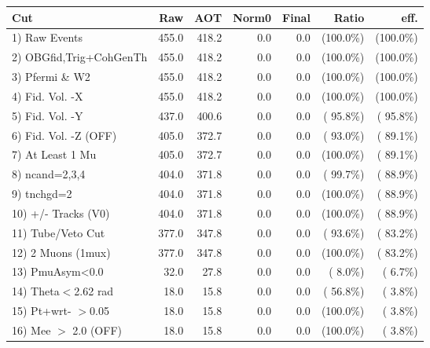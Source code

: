  \begin{table}[h!]\centering
 \begin{tabular}{||l||r|r|r|r|r|r||}
 \hline
 \hline
 Cut & Raw & AOT & Norm0 & Final & Ratio & eff.       \\
 \hline
  1) Raw Events           &        455.0 &        418.2 &          0.0 &          0.0 & (100.0\%) & (100.0\%) \\
  2) OBGfid,Trig+CohGenTh &        455.0 &        418.2 &          0.0 &          0.0 & (100.0\%) & (100.0\%) \\
  3) Pfermi \& W2         &        455.0 &        418.2 &          0.0 &          0.0 & (100.0\%) & (100.0\%) \\
  4) Fid. Vol. -X         &        455.0 &        418.2 &          0.0 &          0.0 & (100.0\%) & (100.0\%) \\
  5) Fid. Vol. -Y         &        437.0 &        400.6 &          0.0 &          0.0 & ( 95.8\%) & ( 95.8\%) \\
  6) Fid. Vol. -Z (OFF)   &        405.0 &        372.7 &          0.0 &          0.0 & ( 93.0\%) & ( 89.1\%) \\
  7) At Least 1 Mu        &        405.0 &        372.7 &          0.0 &          0.0 & (100.0\%) & ( 89.1\%) \\
  8) ncand=2,3,4          &        404.0 &        371.8 &          0.0 &          0.0 & ( 99.7\%) & ( 88.9\%) \\
  9) tnchgd=2             &        404.0 &        371.8 &          0.0 &          0.0 & (100.0\%) & ( 88.9\%) \\
 10) +/- Tracks (V0)      &        404.0 &        371.8 &          0.0 &          0.0 & (100.0\%) & ( 88.9\%) \\
 11) Tube/Veto Cut        &        377.0 &        347.8 &          0.0 &          0.0 & ( 93.6\%) & ( 83.2\%) \\
 12) 2 Muons (1mux)       &        377.0 &        347.8 &          0.0 &          0.0 & (100.0\%) & ( 83.2\%) \\
 13) PmuAsym<0.0          &         32.0 &         27.8 &          0.0 &          0.0 & (  8.0\%) & (  6.7\%) \\
 14) Theta$<$2.62 rad     &         18.0 &         15.8 &          0.0 &          0.0 & ( 56.8\%) & (  3.8\%) \\
 15) Pt+wrt- $>$0.05      &         18.0 &         15.8 &          0.0 &          0.0 & (100.0\%) & (  3.8\%) \\
 16) Mee $>$ 2.0  (OFF)   &         18.0 &         15.8 &          0.0 &          0.0 & (100.0\%) & (  3.8\%) \\

\end{tabular}
\end{table}
